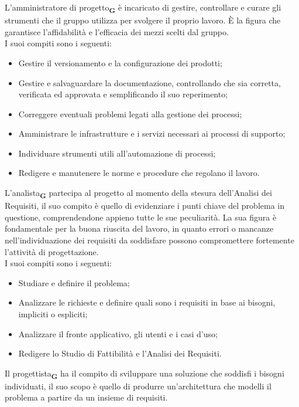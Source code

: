 L’amministratore di progetto\textsubscript{\textbf{G}} è incaricato di gestire, controllare e curare gli strumenti che il gruppo utilizza per svolgere il proprio lavoro. È la figura che garantisce l’affidabilità e l’efficacia dei mezzi scelti dal gruppo.\\
I suoi compiti sono i seguenti:
\begin {itemize}
    \item Gestire il versionamento e la configurazione dei prodotti; 
    \item Gestire e salvaguardare la documentazione, controllando che sia corretta, verificata ed approvata e semplificando il suo reperimento;
    \item Correggere eventuali problemi legati alla gestione dei processi;
    \item Amministrare le infrastrutture e i servizi necessari ai processi di supporto;
    \item Individuare strumenti utili all'automazione di processi;
    \item Redigere e manutenere le norme e procedure che regolano il lavoro.
\end {itemize}
L’analista\textsubscript{\textbf{G}} partecipa al progetto al momento della stesura dell’Analisi dei Requisiti, il suo compito è quello di evidenziare i punti chiave del problema in questione, comprendendone appieno tutte le sue peculiarità. La sua figura è fondamentale per la buona riuscita del lavoro, in quanto errori o mancanze nell’individuazione dei requisiti da soddisfare possono compromettere fortemente l'attività di progettazione.\\
I suoi compiti sono i seguenti:
\begin {itemize}
    \item Studiare e definire il problema; 
    \item Analizzare le richieste e definire quali sono i requisiti in base ai bisogni, impliciti o espliciti;
    \item Analizzare il fronte applicativo, gli utenti e i casi d’uso;
    \item Redigere lo Studio di Fattibilità e l’Analisi dei Requisiti.
\end {itemize}
Il progettista\textsubscript{\textbf{G}} ha il compito di sviluppare una soluzione che soddisfi i bisogni individuati, il suo scopo è quello di produrre un’architettura che modelli il problema a partire da un insieme di requisiti.\\
